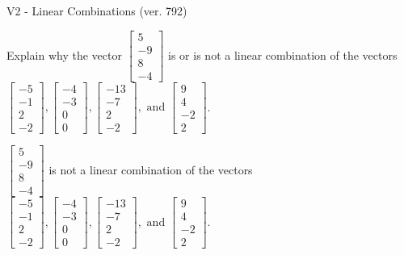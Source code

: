 \begin{exercise}
  \begin{exerciseTitle}V2 - Linear Combinations (ver. 792)\end{exerciseTitle}
  \begin{exerciseStatement}
    Explain why the vector \(\left[\begin{array}{c}
5 \\
-9 \\
8 \\
-4
\end{array}\right]\)  is or is not a linear 
	combination of the vectors \(\left[\begin{array}{c}
-5 \\
-1 \\
2 \\
-2
\end{array}\right] , \left[\begin{array}{c}
-4 \\
-3 \\
0 \\
0
\end{array}\right] , \left[\begin{array}{c}
-13 \\
-7 \\
2 \\
-2
\end{array}\right] , \text{ and } \left[\begin{array}{c}
9 \\
4 \\
-2 \\
2
\end{array}\right]\).
	


  \end{exerciseStatement}
  \begin{exerciseAnswer}
   \(\left[\begin{array}{c}
5 \\
-9 \\
8 \\
-4
\end{array}\right]\) 
  	 is not  
	a linear combination of the vectors \(\left[\begin{array}{c}
-5 \\
-1 \\
2 \\
-2
\end{array}\right] , \left[\begin{array}{c}
-4 \\
-3 \\
0 \\
0
\end{array}\right] , \left[\begin{array}{c}
-13 \\
-7 \\
2 \\
-2
\end{array}\right] , \text{ and } \left[\begin{array}{c}
9 \\
4 \\
-2 \\
2
\end{array}\right]\).


\end{exerciseAnswer}
\end{exercise}
